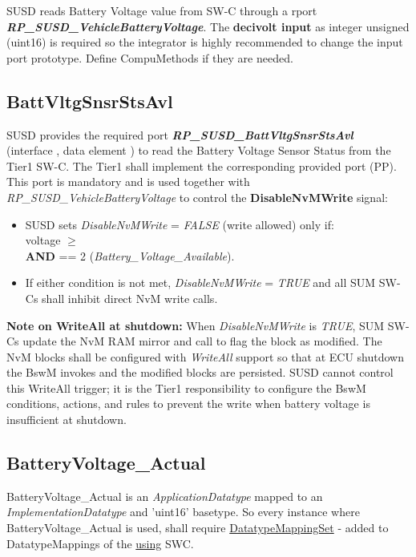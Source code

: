 {SUSD reads Battery Voltage value from SW-C through a rport \textbf{\textit{RP\_SUSD\_VehicleBatteryVoltage}}. The \textbf{decivolt input} as integer unsigned (uint16) is required so
the integrator is highly recommended to change the input port prototype. Define CompuMethods if they are needed.

\subsection{BattVltgSnsrStsAvl}
\label{subsec:battVltgSnsrStsAvl}
SUSD provides the required port \textbf{\textit{RP\_SUSD\_BattVltgSnsrStsAvl}} \\(interface , data element ) to read the Battery Voltage Sensor Status from the Tier1 SW-C. The Tier1 shall implement the corresponding provided port (PP). This port is mandatory and is used together with \textit{RP\_SUSD\_VehicleBatteryVoltage} to control the \textbf{DisableNvMWrite} signal:
\begin{itemize}
\item SUSD sets \textit{DisableNvMWrite} = \textit{FALSE} (write allowed) only if: \\voltage $\geq$  \\ \textbf{AND}  == 2 (\textit{Battery\_Voltage\_Available}).
\item If either condition is not met, \textit{DisableNvMWrite} = \textit{TRUE} and all SUM SW-Cs shall inhibit direct NvM write calls.
\end{itemize}

\textbf{Note on WriteAll at shutdown:} When \textit{DisableNvMWrite} is \textit{TRUE}, SUM SW-Cs update the NvM RAM mirror and call  to flag the block as modified. The NvM blocks shall be configured with \textit{WriteAll} support so that at ECU shutdown the BswM invokes  and the modified blocks are persisted. SUSD cannot control this WriteAll trigger; it is the Tier1 responsibility to configure the BswM conditions, actions, and rules to prevent the write when battery voltage is insufficient at shutdown.

\subsection{BatteryVoltage\_Actual}
BatteryVoltage\_Actual is an \textit{ApplicationDatatype} mapped to an \textit{ImplementationDatatype} and 'uint16' basetype. So every instance where BatteryVoltage\_Actual is used, shall require \underline{DatatypeMappingSet} -  added to DatatypeMappings of the \underline{using} SWC.


}
